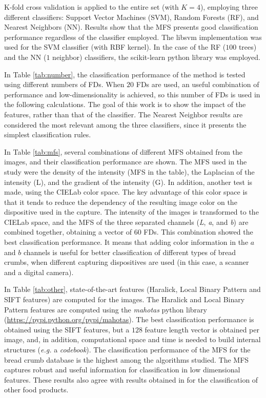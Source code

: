 \documentclass[a4paper,10pt]{article}
\begin{document}
K-fold cross validation is applied to the entire set (with $K=4$), employing three different classifiers: Support Vector Machines (SVM), Random Forests (RF), and Nearest Neighbors (NN). Results show that the MFS presents good classification performance regardless of the classifier employed. The libsvm implementation \cite{Chang2011} was used for the SVM classifier (with RBF kernel). In the case of the RF ($100$ trees) and the NN ($1$ neighbor) classifiers, the scikit-learn python library was employed.

In Table \ref{tab:number}, the classification performance of the method is tested using different numbers of FDs. When $20$ FDs are used, an useful combination of performance and low-dimensionality is achieved, so this number of FDs is used in the following calculations. The goal of this work is to show the impact of the features, rather than that of the classifier. The Nearest Neighbor results are considered the most relevant among the three classifiers, since it presents the simplest classification rules.

In Table \ref{tab:mfs}, several combinations of different MFS obtained from the images, and their classification performance are shown. The MFS used in the study were the density of the intensity (MFS in the table), the Laplacian of the intensity (L), and the gradient of the intensity (G). In addition, another test is made, using the CIELab color space. The key advantage of this color space is that it tends to reduce the dependency of the resulting image color on the dispositive used in the capture. The intensity of the images is transformed to the CIELab space, and the MFS of the three separated channels ({\em L}, {\em a}, and {\em b}) are combined together, obtaining a vector of $60$ FDs. This combination showed the best classification performance. It means that adding color information in the $a$ and $b$ channels is useful for better classification of different types of bread crumbs, when different capturing dispositives are used (in this case, a scanner and a digital camera).

In Table \ref{tab:other}, state-of-the-art features (Haralick, Local Binary Pattern and SIFT features) are computed for the images. The Haralick and Local Binary Pattern features are computed using the {\em mahotas} python library (\url{https://pypi.python.org/pypi/mahotas}). The best classification performance is obtained using the SIFT features, but a $128$ feature length vector is obtained per image, and, in addition, computational space and time is needed to build internal structures ({\em e.g.} a {\em codebook}). The classification performance of the MFS for the bread crumb database is the highest among the algorithms studied. The MFS captures robust and useful information for classification in low dimensional features. These results also agree with results obtained in \cite{Bosch2011} for the classification of other food products.
\end{document}

